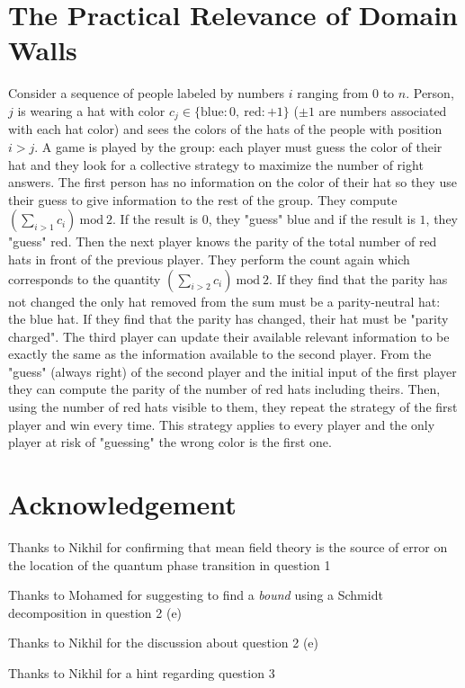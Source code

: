 \documentclass[10pt, a4paper]{article}
\begin{document}
{\section{The Practical Relevance of Domain Walls}
Consider a sequence of people labeled by numbers $i$ ranging from $0$ to $n$. Person, $j$ is wearing a hat with color $c_j \in \{\text{blue}: 0,\ \text{red} : +1\}$ ($\pm 1$ are numbers associated with each hat color) and sees the colors of the hats of the people with position $i > j$. A game is played by the group: each player must guess the color of their hat and they look for a collective strategy to maximize the number of right answers. The first person has no information on the color of their hat so they use their guess to give information to the rest of the group. They compute $(\sum_{i > 1} c_i)\ \text{mod}\ 2$. If the result is $0$, they "guess" blue and if the result is $1$, they "guess" red. Then the next player knows the parity of the total number of red hats in front of the previous player. They perform the count again which corresponds to the quantity $(\sum_{i > 2} c_i)\ \text{mod}\ 2$. If they find that the parity has not changed the only hat removed from the sum must be a parity-neutral hat: the blue hat. If they find that the parity has changed, their hat must be "parity charged". The third player can update their available relevant information to be exactly the same as the information available to the second player. From the "guess" (always right) of the second player and the initial input of the first player they can compute the parity of the number of red hats including theirs. Then, using the number of red hats visible to them, they repeat the strategy of the first player and win every time. This strategy applies to every player and the only player at risk of "guessing" the wrong color is the first one. 

\section{Acknowledgement}
Thanks to Nikhil for confirming that mean field theory is the source of error on the location of the quantum phase transition in question 1 

Thanks to Mohamed for suggesting to find a \textit{bound} using a Schmidt decomposition in question 2 (e)

Thanks to Nikhil for the discussion about question 2 (e)

Thanks to Nikhil for a hint regarding question 3

}

\makereferences


\end{document}
